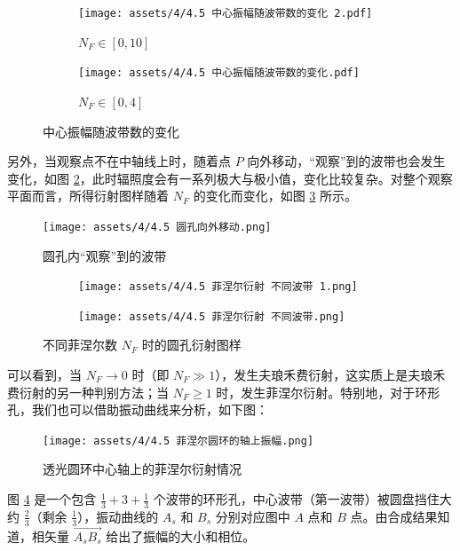 \documentclass[UTF8]{report}
\theoremstyle{MyLineTheoremStyle} %
\theoremstyle{MyBlockTheoremStyle} %
\theoremstyle{MySubsubsectionStyle} %
\begin{document}
\begin{figure}[H]\centering
\begin{subfigure}[b]{0.5\columnwidth}\centering
    \texttt{[image: assets/4/4.5 中心振幅随波带数的变化 2.pdf]}
    \caption{$N_F \in [0, 10]$}
\end{subfigure}\hfill
\begin{subfigure}[b]{0.5\columnwidth}\centering
    \texttt{[image: assets/4/4.5 中心振幅随波带数的变化.pdf]}
    \caption{$N_F \in [0, 4]$}
\end{subfigure}
\caption{中心振幅随波带数的变化}
\label{中心振幅随波带数的变化}
\end{figure}


另外，当观察点不在中轴线上时，随着点 $P$ 向外移动，“观察”到的波带也会发生变化，如图 \ref{圆孔向外移动}，此时辐照度会有一系列极大与极小值，变化比较复杂。对整个观察平面而言，所得衍射图样随着 $N_F$ 的变化而变化，如图 \ref{不同菲涅尔数时的圆孔衍射图样} 所示。
\begin{figure}[H]\centering
    \texttt{[image: assets/4/4.5 圆孔向外移动.png]}
    \caption{圆孔内“观察”到的波带}\label{圆孔向外移动}
\end{figure}

\begin{figure}[H]\centering
\begin{subfigure}[b]{0.59\columnwidth}\centering
    \texttt{[image: assets/4/4.5 菲涅尔衍射 不同波带 1.png]}
\end{subfigure}
\begin{subfigure}[b]{0.39\columnwidth}\centering
    \texttt{[image: assets/4/4.5 菲涅尔衍射 不同波带.png]}
\end{subfigure}
\caption{不同菲涅尔数 $N_F$ 时的圆孔衍射图样}
\label{不同菲涅尔数时的圆孔衍射图样}
\end{figure}



可以看到，当 $N_F \to 0 $ 时（即 $N_F \gg 1$），发生夫琅禾费衍射，这实质上是夫琅禾费衍射的另一种判别方法；当 $N_F \geqslant 1$ 时，发生菲涅尔衍射。特别地，对于环形孔，我们也可以借助振动曲线来分析，如下图：
\begin{figure}[H]\centering
    \texttt{[image: assets/4/4.5 菲涅尔圆环的轴上振幅.png]}
    \caption{透光圆环中心轴上的菲涅尔衍射情况}\label{透光圆环中心轴上的菲涅尔衍射情况}
\end{figure}
图 \ref{透光圆环中心轴上的菲涅尔衍射情况} 是一个包含 $\frac{1}{3} + 3 + \frac{1}{3}$ 个波带的环形孔，中心波带（第一波带）被圆盘挡住大约 $\frac{2}{3}$（剩余 $\frac{1}{3}$），振动曲线的 $A_s$ 和 $B_s$ 分别对应图中 $A$ 点和 $B$ 点。由合成结果知道，相矢量 $\overrightarrow{A_sB_s}$ 给出了振幅的大小和相位。
\end{document}
